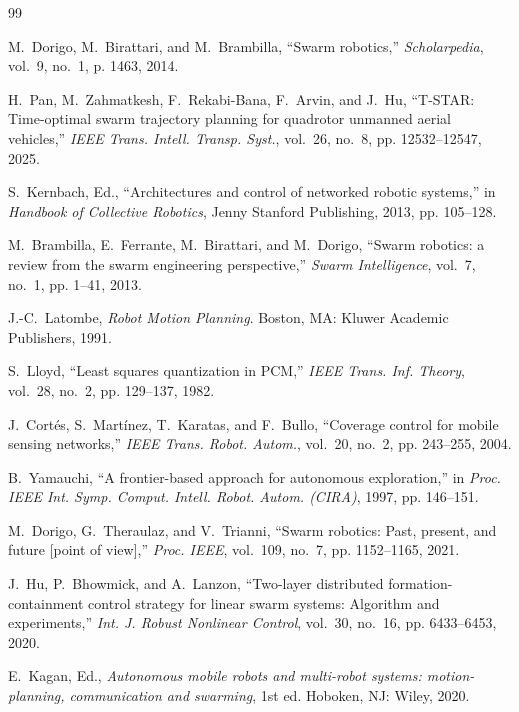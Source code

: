 \documentclass[letterpaper, 10pt, conference]{IEEEtran}
\begin{document}
\begin{thebibliography}{99}

M.~Dorigo, M.~Birattari, and M.~Brambilla, ``Swarm robotics,'' \emph{Scholarpedia}, vol.~9, no.~1, p. 1463, 2014.

H.~Pan, M.~Zahmatkesh, F.~Rekabi-Bana, F.~Arvin, and J.~Hu, ``T-STAR: Time-optimal swarm trajectory planning for quadrotor unmanned aerial vehicles,'' \emph{IEEE Trans. Intell. Transp. Syst.}, vol.~26, no.~8, pp. 12532--12547, 2025.

S.~Kernbach, Ed., ``Architectures and control of networked robotic systems,'' in \emph{Handbook of Collective Robotics}, Jenny Stanford Publishing, 2013, pp. 105--128.

M.~Brambilla, E.~Ferrante, M.~Birattari, and M.~Dorigo, ``Swarm robotics: a review from the swarm engineering perspective,'' \emph{Swarm Intelligence}, vol.~7, no.~1, pp. 1--41, 2013.

J.-C.~Latombe, \emph{Robot Motion Planning}. Boston, MA: Kluwer Academic Publishers, 1991.

S.~Lloyd, ``Least squares quantization in {PCM},'' \emph{IEEE Trans. Inf. Theory}, vol.~28, no.~2, pp. 129--137, 1982.

J.~Cortés, S.~Martínez, T.~Karatas, and F.~Bullo, ``Coverage control for mobile sensing networks,'' \emph{IEEE Trans. Robot. Autom.}, vol.~20, no.~2, pp. 243--255, 2004.

B.~Yamauchi, ``A frontier-based approach for autonomous exploration,'' in \emph{Proc. IEEE Int. Symp. Comput. Intell. Robot. Autom. (CIRA)}, 1997, pp. 146--151.

M.~Dorigo, G.~Theraulaz, and V.~Trianni, ``Swarm robotics: Past, present, and future [point of view],'' \emph{Proc. IEEE}, vol.~109, no.~7, pp. 1152--1165, 2021.

J.~Hu, P.~Bhowmick, and A.~Lanzon, ``Two-layer distributed formation-containment control strategy for linear swarm systems: Algorithm and experiments,'' \emph{Int. J. Robust Nonlinear Control}, vol.~30, no.~16, pp. 6433--6453, 2020.

E.~Kagan, Ed., \emph{Autonomous mobile robots and multi-robot systems: motion-planning, communication and swarming}, 1st ed. Hoboken, NJ: Wiley, 2020.


\end{thebibliography}
\end{document}
